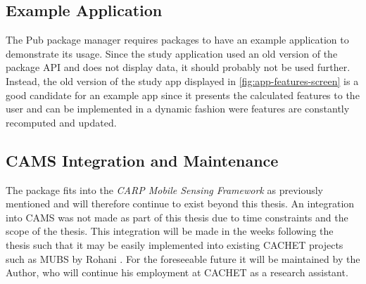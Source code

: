 \subsection{Example Application}
The Pub package manager requires packages to have an example application to demonstrate its usage. Since the study application used an old version of the package API and does not display data, it should probably not be used further. Instead, the old version of the study app displayed in \ref{fig:app-features-screen} is a good candidate for an example app since it presents the calculated features to the user and can be implemented in a dynamic fashion were features are constantly recomputed and updated.

\subsection{CAMS Integration and Maintenance}
The package fits into the \textit{CARP Mobile Sensing Framework} as previously mentioned and will therefore continue to exist beyond this thesis. An integration into CAMS was not made as part of this thesis due to time constraints and the scope of the thesis. This integration will be made in the weeks following the thesis such that it may be easily implemented into existing CACHET projects such as MUBS by Rohani \cite{mubs-rohani}. For the foreseeable future it will be maintained by the Author, who will continue his employment at CACHET as a research assistant. 